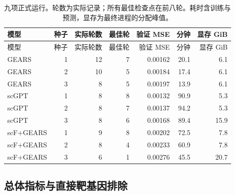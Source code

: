 {\footnotesize\linespread{1}\selectfont\setlength{\tabcolsep}{4pt}\renewcommand{\arraystretch}{1.08}\begin{longtable}{lrrrrrr}\caption{九项正式运行。轮数为实际记录；所有最佳检查点在前八轮。耗时含训练与预测，显存为最终进程的分配峰值。}\\\toprule 模型 & 种子 & 实际轮数 & 最佳轮 & 验证 MSE & 分钟 & 显存 GiB\\\midrule\endfirsthead\toprule 模型 & 种子 & 实际轮数 & 最佳轮 & 验证 MSE & 分钟 & 显存 GiB\\\midrule\endhead
GEARS & 1 & 12 & 7 & 0.00162 & 20.1 & 6.1\\
GEARS & 2 & 10 & 5 & 0.00184 & 17.4 & 6.1\\
GEARS & 3 & 8 & 5 & 0.00197 & 13.9 & 6.1\\
scGPT & 1 & 8 & 8 & 0.00132 & 90.9 & 5.3\\
scGPT & 2 & 8 & 7 & 0.00137 & 94.2 & 5.3\\
scGPT & 3 & 8 & 6 & 0.00168 & 89.4 & 15.9\\
scF+GEARS & 1 & 9 & 8 & 0.00202 & 72.5 & 7.8\\
scF+GEARS & 2 & 8 & 4 & 0.00233 & 60.9 & 7.8\\
scF+GEARS & 3 & 6 & 1 & 0.00276 & 45.5 & 20.7\\
\bottomrule\end{longtable}}
\clearpage\subsection{总体指标与直接靶基因排除}
